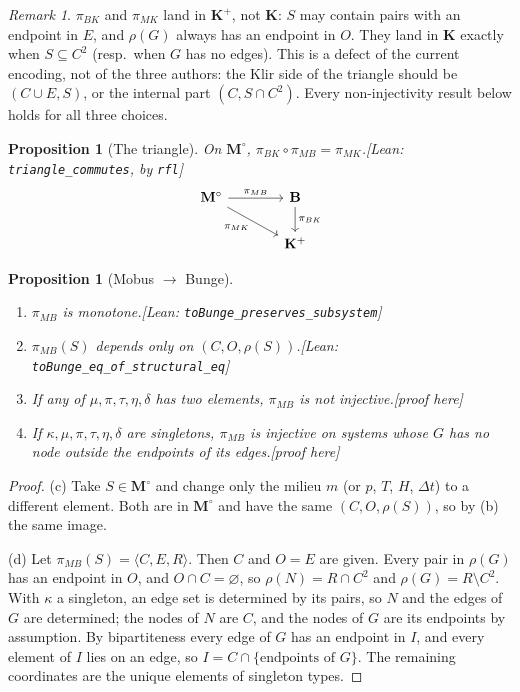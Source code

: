 \documentclass[11pt]{article}
\newtheorem{proposition}[theorem]{Proposition}
\theoremstyle{definition}
\theoremstyle{remark}
\newtheorem{remark}[theorem]{Remark}
\newcommand{\K}{\mathbf{K}}
\newcommand{\Kp}{\mathbf{K}^{+}}
\newcommand{\B}{\mathbf{B}}
\newcommand{\Mo}{\mathbf{M}^{\circ}}
\newcommand{\lean}[1]{\texttt{#1}}
\newcommand{\status}[1]{\hfill\textsf{\small[#1]}}
\newcommand{\pBK}{\pi_{BK}}
\newcommand{\pMB}{\pi_{MB}}
\newcommand{\pMK}{\pi_{MK}}
\begin{document}
\begin{remark}\label{rem:target}
$\pBK$ and $\pMK$ land in $\Kp$, not $\K$: $S$ may contain pairs with an endpoint in $E$, and $\rho(G)$ always has an endpoint in $O$. They land in $\K$ exactly when $S\subseteq C^2$ (resp.\ when $G$ has no edges). This is a defect of the current encoding, not of the three authors: the Klir side of the triangle should be $(C\cup E,S)$, or the internal part $(C,S\cap C^2)$. Every non-injectivity result below holds for all three choices.
\end{remark}

\begin{proposition}[The triangle]\label{prop:triangle}
On $\Mo$, $\pBK\circ\pMB=\pMK$.\status{Lean: \lean{triangle\_commutes}, by \lean{rfl}}
\[\begin{tikzcd}[column sep=large]
\Mo \arrow[r,"\pMB"] \arrow[dr,"\pMK"'] & \B \arrow[d,"\pBK"]\\
& \Kp
\end{tikzcd}\]
\end{proposition}

\begin{proposition}[Mobus $\to$ Bunge]\label{prop:MB}\leavevmode
\begin{enumerate}[label=(\alph*),nosep]
\item $\pMB$ is monotone.\status{Lean: \lean{toBunge\_preserves\_subsystem}}
\item $\pMB(S)$ depends only on $(C,O,\rho(S))$.\status{Lean: \lean{toBunge\_eq\_of\_structural\_eq}}
\item If any of $\mu,\pi,\tau,\eta,\delta$ has two elements, $\pMB$ is not injective.\status{proof here}
\item If $\kappa,\mu,\pi,\tau,\eta,\delta$ are singletons, $\pMB$ is injective on systems whose $G$ has no node outside the endpoints of its edges.\status{proof here}
\end{enumerate}
\end{proposition}
\begin{proof}
(c) Take $S\in\Mo$ and change only the milieu $m$ (or $p$, $T$, $H$, $\Delta t$) to a different element. Both are in $\Mo$ and have the same $(C,O,\rho(S))$, so by (b) the same image.

(d) Let $\pMB(S)=\langle C,E,R\rangle$. Then $C$ and $O=E$ are given. Every pair in $\rho(G)$ has an endpoint in $O$, and $O\cap C=\varnothing$, so $\rho(N)=R\cap C^2$ and $\rho(G)=R\setminus C^2$. With $\kappa$ a singleton, an edge set is determined by its pairs, so $N$ and the edges of $G$ are determined; the nodes of $N$ are $C$, and the nodes of $G$ are its endpoints by assumption. By bipartiteness every edge of $G$ has an endpoint in $I$, and every element of $I$ lies on an edge, so $I=C\cap\{\text{endpoints of }G\}$. The remaining coordinates are the unique elements of singleton types.
\end{proof}
\end{document}
